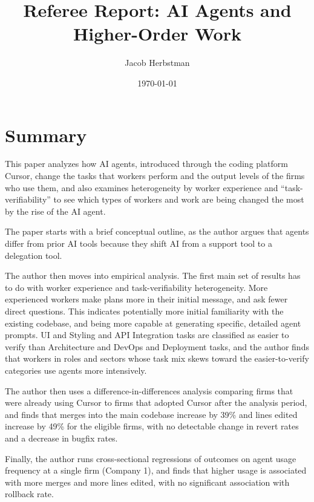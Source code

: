 \documentclass{article}
\title{Referee Report: AI Agents and Higher-Order Work}
\author{Jacob Herbstman}
\date{\today}
\begin{document}
\maketitle

\section*{Summary}

This paper analyzes how AI agents, introduced through the coding platform Cursor, change the tasks that workers perform and the output levels of the firms who use them, and also examines heterogeneity by worker experience and ``task-verifiability'' to see which types of workers and work are being changed the most by the rise of the AI agent.

The paper starts with a brief conceptual outline, as the author argues that agents differ from prior AI tools because they shift AI from a support tool to a delegation tool.

The author then moves into empirical analysis.
The first main set of results has to do with worker experience and task-verifiability heterogeneity.
More experienced workers make plans more in their initial message, and ask fewer direct questions.
This indicates potentially more initial familiarity with the existing codebase, and being more capable at generating specific, detailed agent prompts.
UI and Styling and API Integration tasks are classified as easier to verify than Architecture and DevOps and Deployment tasks, and the author finds that workers in roles and sectors whose task mix skews toward the easier-to-verify categories use agents more intensively.

The author then uses a difference-in-differences analysis comparing firms that were already using Cursor to firms that adopted Cursor after the analysis period, and finds that merges into the main codebase increase by 39\% and lines edited increase by 49\% for the eligible firms, with no detectable change in revert rates and a decrease in bugfix rates.

Finally, the author runs cross-sectional regressions of outcomes on agent usage frequency at a single firm (Company 1), and finds that higher usage is associated with more merges and more lines edited, with no significant association with rollback rate.
\end{document}
